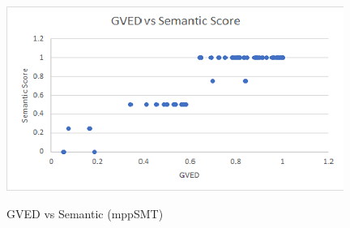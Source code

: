 \begin{figure}
\caption{GVED vs Semantic (mppSMT)}
\centering
\includegraphics{img/gved_mppSMT.png}
\label{fig:GVEDmppSMT}
\end{figure}